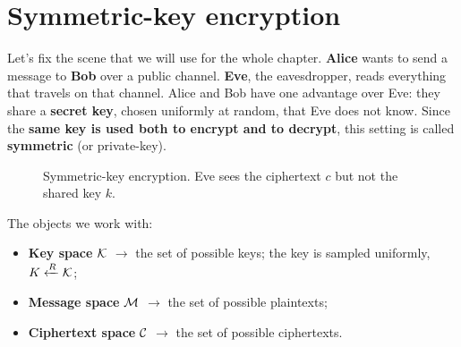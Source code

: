 
\section{Symmetric-key encryption}\label{sec:ske}

Let's fix the scene that we will use for the whole chapter. \textbf{Alice} wants to send a message to \textbf{Bob} over a public channel. \textbf{Eve}, the eavesdropper, reads everything that travels on that channel. Alice and Bob have one advantage over Eve: they share a \textbf{secret key}, chosen uniformly at random, that Eve does not know. Since the \textbf{same key is used both to encrypt and to decrypt}, this setting is called \textbf{symmetric} (or private-key).

\begin{figure}[H]
  \centering
  \caption{Symmetric-key encryption. Eve sees the ciphertext $c$ but not the shared key $k$.}
\end{figure}

The objects we work with:
\begin{itemize}
  \item \textbf{Key space} $\mathcal{K}$ $\to$ the set of possible keys; the key is sampled uniformly, $K \xleftarrow{R} \mathcal{K}$;
  \item \textbf{Message space} $\mathcal{M}$ $\to$ the set of possible plaintexts;
  \item \textbf{Ciphertext space} $\mathcal{C}$ $\to$ the set of possible ciphertexts.
\end{itemize}

